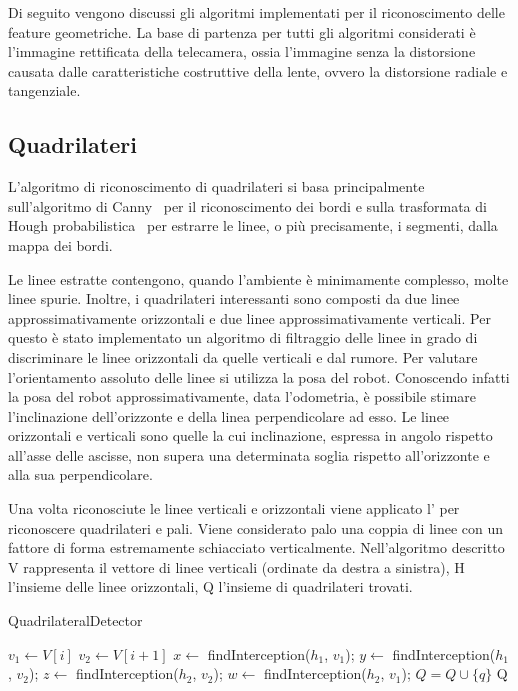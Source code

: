 Di seguito vengono discussi gli algoritmi implementati per il riconoscimento delle feature geometriche.
La base di partenza per tutti gli algoritmi considerati è l'immagine rettificata della telecamera, ossia l'immagine senza la distorsione causata dalle caratteristiche costruttive della lente, ovvero la distorsione radiale e tangenziale.

\subsection{Quadrilateri}

L'algoritmo di riconoscimento di quadrilateri si basa principalmente sull'algoritmo di Canny~\cite{4767851} per il riconoscimento dei bordi e sulla trasformata di Hough probabilistica~\cite{matas2000robust} per estrarre le linee, o più precisamente, i segmenti, dalla mappa dei bordi.

Le linee estratte contengono, quando l'ambiente è minimamente complesso, molte linee spurie. Inoltre, i quadrilateri interessanti sono composti da due linee approssimativamente orizzontali e due linee approssimativamente verticali. Per questo è stato implementato un algoritmo di filtraggio delle linee in grado di discriminare le linee orizzontali da quelle verticali e dal rumore. Per valutare l'orientamento assoluto delle linee si utilizza la posa del robot. Conoscendo infatti la posa del robot approssimativamente, data l'odometria, è possibile stimare l'inclinazione dell'orizzonte e della linea perpendicolare ad esso. Le linee orizzontali e verticali sono quelle la cui inclinazione, espressa in angolo rispetto all'asse delle ascisse, non supera una determinata soglia rispetto all'orizzonte e alla sua perpendicolare.

Una volta riconosciute le linee verticali e orizzontali viene applicato l' per riconoscere quadrilateri e pali.
Viene considerato palo una coppia di linee con un fattore di forma estremamente schiacciato verticalmente. Nell'algoritmo descritto V rappresenta il vettore di linee verticali (ordinate da destra a sinistra), H l'insieme delle linee orizzontali, Q l'insieme di quadrilateri trovati.

\begin{algorithm}[ht]
\caption{QuadrilateralDetector}
\begin{algorithmic}[1] 
\label{alg:quad-det}
  \STATE $v_{1} \leftarrow V[i]$
  \STATE $v_{2} \leftarrow V[i+1]$
      \STATE $x \leftarrow$ findInterception($h_{1}$, $v_{1}$);
      \STATE $y \leftarrow$ findInterception($h_{1}$, $v_{2}$);
      \STATE $z \leftarrow$ findInterception($h_{2}$, $v_{2}$);
      \STATE $w \leftarrow$ findInterception($h_{2}$, $v_{1}$);
	\STATE $Q = Q \cup \lbrace q \rbrace$
      \ENDIF
    \ENDFOR
  \ENDIF
\ENDFOR
\RETURN Q
\end{algorithmic}
\end{algorithm}

